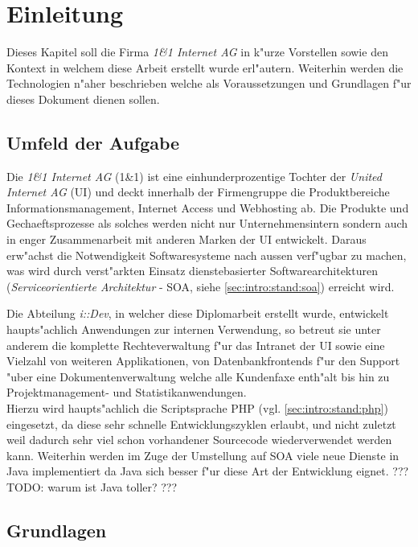 \chapter{Einleitung}
\label{sec:intro}

Dieses Kapitel soll die Firma \emph{1\&1 Internet AG} in k"urze Vorstellen sowie
den Kontext in welchem diese Arbeit erstellt wurde erl"autern. Weiterhin werden
die Technologien n"aher beschrieben welche als Voraussetzungen und Grundlagen f"ur
dieses Dokument dienen sollen.

\section{Umfeld der Aufgabe}
\label{sec:intro:kontext}

Die \emph{1\&1 Internet AG} (1\&1) ist eine einhunderprozentige Tochter der 
\emph{United Internet AG} (UI) und deckt innerhalb der Firmengruppe die Produktbereiche Informationsmanagement,
Internet Access und Webhosting ab. Die Produkte und Gechaeftsprozesse als solches werden
nicht nur Unternehmensintern sondern auch in enger Zusammenarbeit mit anderen Marken
der UI entwickelt. Daraus erw"achst die Notwendigkeit Softwaresysteme nach aussen
verf"ugbar zu machen, was wird durch verst"arkten Einsatz dienstebasierter 
Softwarearchitekturen (\emph{Serviceorientierte Architektur} - SOA, siehe \ref{sec:intro:stand:soa}) erreicht wird.

Die Abteilung \emph{i::Dev}, in welcher diese Diplomarbeit erstellt wurde, entwickelt
haupts"achlich Anwendungen zur internen Verwendung, so betreut sie unter anderem 
die komplette Rechteverwaltung f"ur das Intranet der UI sowie eine Vielzahl von
weiteren Applikationen, von Datenbankfrontends f"ur den Support "uber eine Dokumentenverwaltung
welche alle Kundenfaxe enth"alt bis hin zu Projektmanagement- und Statistikanwendungen.\\
Hierzu wird haupts"achlich die Scriptsprache PHP (vgl. \ref{sec:intro:stand:php}) eingesetzt, da diese sehr schnelle 
Entwicklungszyklen erlaubt, und nicht zuletzt weil dadurch sehr viel schon vorhandener
Sourcecode wiederverwendet werden kann. Weiterhin werden im Zuge der Umstellung auf SOA viele neue 
Dienste in Java implementiert da Java sich besser f"ur diese Art der Entwicklung eignet. 
??? TODO: warum ist Java toller? ???

\section{Grundlagen}
\label{sec:intro:stand}

